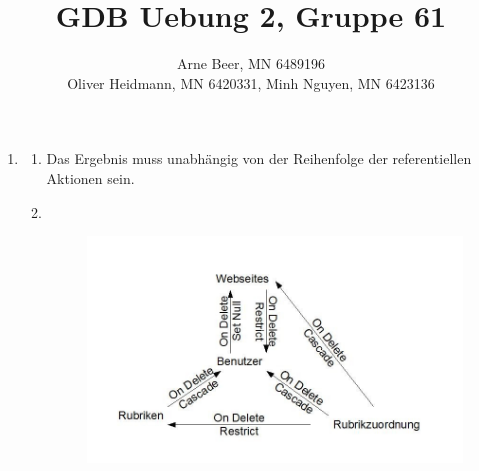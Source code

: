 \documentclass{article}
\title{GDB Uebung 2, Gruppe 61}
\author{Arne Beer, MN 6489196\\
        Oliver Heidmann, MN 6420331,
        Minh Nguyen, MN 6423136}
\begin{document}
    \maketitle
    \begin{enumerate}
        \item
            \begin{enumerate}
                \item 
                    Das Ergebnis muss unabhängig von der Reihenfolge der referentiellen Aktionen sein.

                \item $\text{  }$
                    \begin{figure}[ht!]
                        \centering
                        \includegraphics[width=180mm]{gdb1.jpg}
                    \end{figure}


\end{enumerate}
\end{enumerate}
\end{document}
